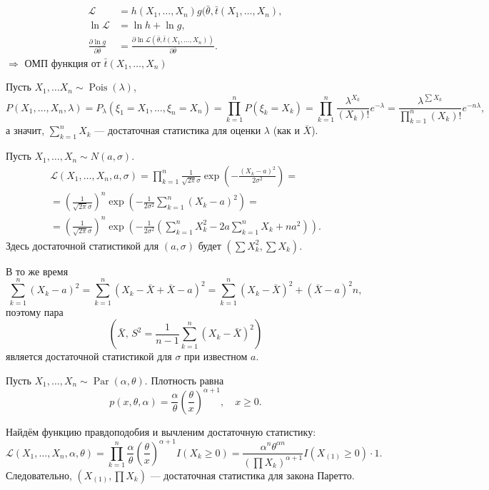 \begin{remark}
  \begin{align*}
		\mathscr{L} &= h(X_1, \dots, X_n) g(\bar\theta, \bar t(X_1, \dots, X_n),\\
		\ln \mathscr{L} &= \ln h + \ln g,\\
		\frac{\partial \ln g}{\partial \bar \theta} &= \frac{\partial \ln \mathscr{L} (\bar\theta, \bar t(X_1, \dots,
	X_n))}{\partial \bar\theta}.
  \end{align*}
  $\Rightarrow$ ОМП функция от $\bar t(X_1, \dots, X_n)$
\end{remark}

\begin{ex}
	Пусть $X_1, \dots X_n \sim \operatorname{Pois}(\lambda)$, 
  \[
    P(X_1, \dots, X_n, \lambda) = P_\lambda (\xi_1=X_1, \dots, \xi_n=X_n) =
		\prod_{k=1}^n P(\xi_k = X_k) = \prod_{k=1}^n \frac{\lambda^{X_k}}{(X_k)!}
		e^{-\lambda} =
		\frac{\lambda^{\sum X_k}}{\prod_{k=1}^n (X_k)!}  e^{-n\lambda},
  \]
	а значит, $\sum_{k=1}^n X_k$ --- достаточная статистика для оценки $\lambda$
	(как и $\bar X$).
\end{ex}

\begin{ex}
  Пусть $X_1, \dots, X_n \sim N(a, \sigma)$.
  \begin{multline*}
		\mathscr{L} (X_1, \dots, X_n, a, \sigma) = \prod_{k=1}^n \frac{1}{\sqrt{2\pi}
		\sigma} \exp\left(-\frac{(X_k-a)^2}{2\sigma^2}\right) =\\= 
		\left(\frac{1}{\sqrt{2\pi}\sigma} \right)^n
		\exp\left(-\frac{1}{2\sigma^2} \sum_{k=1}^n (X_k-a)^2\right) = \\ =
		\left(\frac{1}{\sqrt{2\pi}\sigma}\right)^n \exp\left(-\frac{1}{2\sigma^2}
			\left(\sum_{k=1}^n
		X_k^2 - 2a \sum_{k=1}^n X_k + na^2\right)\right).
  \end{multline*}
  Здесь достаточной статистикой для $ (a, \sigma) $ будет $(\sum X_k^2, \sum
	X_k)$.

  В то же время
	\[
		\sum_{k=1}^n (X_k-a)^2 = \sum_{k=1}^n (X_k - \bar X + \bar X - a)^2 =
		\sum_{k=1}^n (X_k-\bar X)^2 + (\bar X - a)^2 n,
	\]
	поэтому пара
	\[
		\left(\bar X,\, S^2 = \frac{1}{n-1} \sum_{k=1}^n (X_k-\bar X)^2\right)
	\]
	является достаточной статистикой для $\sigma$ при известном $a$.
\end{ex}

\begin{ex}
	Пусть $X_1, \dots, X_n \sim \operatorname{Par}(\alpha, \theta)$. Плотность
	равна
	\[
		p(x, \theta, \alpha) = \frac{\alpha}{\theta}
		\left(\frac{\theta}{x}\right)^{\alpha+1}, \quad x\geqslant 0.
	\]

	Найдём функцию правдоподобия и вычленим достаточную статистику:
  \[
		\mathscr{L} (X_1, \dots, X_n, \alpha, \theta) = \prod_{k=1}^n \frac{\alpha}{\theta}
		\left(\frac{\theta}{x}\right)^{\alpha+1} I(X_k \geqslant 0) = \frac{\alpha^n
		\theta^{\alpha n}}{(\prod X_k)^{\alpha+1}} I(X_{(1)}\geqslant 0) \cdot 1.
  \]
Следовательно, 
  $(X_{(1)}, \prod X_k)$ --- достаточная статистика для закона Паретто.
\end{ex}

